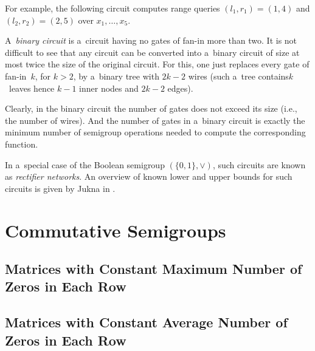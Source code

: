 \documentclass[11pt,letterpaper]{article}
\begin{document}

For example, the following circuit computes range queries $(l_1,r_1)=(1,4)$ and $(l_2,r_2)=(2,5)$ over $x_1, \dotsc, x_5$.
\begin{center}
\end{center}

A~{\em binary circuit} is a~circuit having no gates of fan-in more than two. It is not difficult to see that any circuit can be converted into a~binary circuit of size at most twice the size of the original circuit. For this, one just replaces every gate of fan-in~$k$, for $k>2$, by a~binary tree with $2k-2$ wires (such a~tree contains$k$~leaves hence $k-1$ inner nodes and $2k-2$ edges).

Clearly, in the binary circuit the number of gates does not exceed its size (i.e., the number of wires). And the number of gates in a~binary circuit is exactly the minimum number of semigroup operations needed to compute the corresponding function.

In a~special case of the Boolean semigroup $(\{0,1\}, \lor)$, such circuits are known as {\em rectifier networks}. An overview of known lower and upper bounds for such circuits is given by Jukna in \cite[Section~13.6]{DBLP:books/daglib/0028687}.




\section{Commutative Semigroups}



\subsection{Matrices with Constant Maximum Number of Zeros in Each Row}

\subsection{Matrices with Constant Average Number of Zeros in Each Row}
\end{document}
